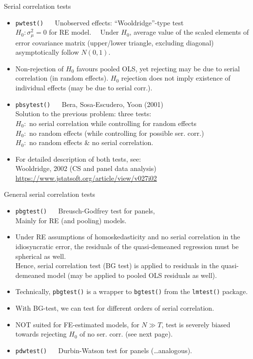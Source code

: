 \documentclass{beamer}
\begin{document}
\begin{frame}{Serial correlation tests}
\begin{itemize}
    \item \texttt{pwtest()} ~~ Unobserved effects: ``Wooldridge''-type test\\
        $H_0: \sigma_{\mu}^2 = 0$ for RE model. ~~Under $H_0$, average value of the scaled elements of error covariance matrix (upper/lower triangle, excluding diagonal) asymptotically follow $N(0,1)$.
        \smallskip 
        \item[] Non-rejection of $H_0$ favours pooled OLS, yet rejecting may be due to serial correlation (in random effects). $H_0$ rejection does not imply existence of individual effects (may be due to serial corr.).
        \bigskip
        \item \texttt{pbsytest()} ~~ Bera, Sosa-Escudero, Yoon (2001)\\
        Solution to the previous problem: three tests:\\
        $H_0:$ no serial correlation while controlling for random effects\\
        $H_0:$ no random effects (while controlling for possible ser. corr.)\\
        $H_0:$ no random effects \& no serial correlation.
        \bigskip
        \item For detailed description of both tests, see: \\
        Wooldridge, 2002 (CS and panel data analysis)\\
        \url{https://www.jstatsoft.org/article/view/v027i02}
\end{itemize}
\end{frame}
\begin{frame}{General serial correlation tests}
\begin{itemize}
    \item \texttt{pbgtest()} ~~ Breusch-Godfrey test for panels,\\ Mainly for RE (and pooling) models.\\
    \smallskip
    \item Under RE assumptions of homoskedasticity and no serial correlation in the idiosyncratic error, the residuals of the quasi-demeaned regression must be spherical as well.\\
    Hence, serial correlation test (BG test) is applied to residuals in the quasi-demeaned model (may be applied to pooled OLS residuals as well).\\
    \smallskip
    \item Technically, \texttt{pbgtest()} is a wrapper to \texttt{bgtest()} from the \texttt{lmtest()} package. 
    \smallskip
    \item With BG-test, we can test for different orders of serial correlation.
    \smallskip
    \item NOT suited for FE-estimated models, for $N \gg T$, test is severely biased towards rejecting $H_0$ of no ser. corr. (see next page).
    \medskip
    \item \texttt{pdwtest()} ~~ Durbin-Watson test for panels (\dots analogous).
\end{itemize}
\end{frame}
\end{document}
